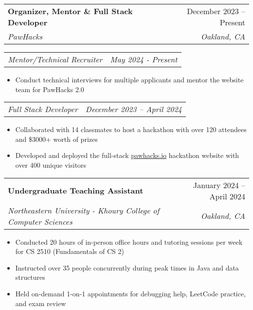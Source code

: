 \documentclass[letterpaper,11pt]{article}
\makeatletter
\newcommand{\resumeItem}[1]{
  \item\small{
    {#1 \vspace{-2pt}}
  }
}
\newcommand{\resumeSubheading}[4]{
  \vspace{-2pt}\item
    \begin{tabular*}{0.97\textwidth}[t]{l@{\extracolsep{\fill}}r}
      \textbf{#1} & #2 \\
      \textit{\small#3} & \textit{\small #4} \\
    \end{tabular*}\vspace{-7pt}
}
\newcommand{\resumeSubSubheading}[2]{
    \item
    \begin{tabular*}{0.97\textwidth}{l@{\extracolsep{\fill}}r}
      \textit{\small#1} & \textit{\small #2} \\
    \end{tabular*}\vspace{-7pt}
}
\newcommand{\resumeItemListStart}{\begin{itemize}}
\newcommand{\resumeItemListEnd}{\end{itemize}\vspace{-5pt}}
\makeatother
\begin{document}

    \resumeSubheading
      {Organizer, Mentor \& Full Stack Developer}{December 2023 -- Present}
      {PawHacks}{Oakland, CA} 

      \resumeSubSubheading
      {Mentor/Technical Recruiter}{May 2024 - Present}
      \resumeItemListStart
        \resumeItem
          {Conduct technical interviews for multiple applicants and mentor the website team for PawHacks 2.0}
      \resumeItemListEnd

      \resumeSubSubheading
      {Full Stack Developer}{December 2023 -- April 2024}
      \resumeItemListStart
        \resumeItem{Collaborated with 14 classmates to host a hackathon with over 120 attendees and \$3000+ worth of prizes}
        \resumeItem{Developed and deployed the full-stack \underline{\href{https://pawhacks.io}{pawhacks.io}} hackathon website with over 400 unique visitors}
      \resumeItemListEnd


    \resumeSubheading
      {Undergraduate Teaching Assistant}{January 2024 -- April 2024}
      {Northeastern University - Khoury College of Computer Sciences}{Oakland, CA}
      \resumeItemListStart
        \resumeItem{Conducted 20 hours of in-person office hours and tutoring sessions per week for CS 2510 (Fundamentals of CS 2)}
        \resumeItem{Instructed over 35 people concurrently during peak times in Java and data structures}
        \resumeItem{Held on-demand 1-on-1 appointments for debugging help, LeetCode practice, and exam review}
      \resumeItemListEnd


\end{document}
